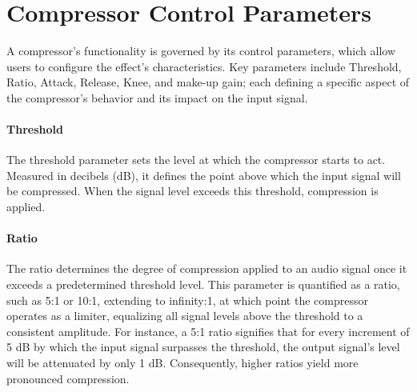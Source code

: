 \documentclass[10pt]{article}
\begin{document}
\begin{multicols*}{2}
\begin{minipage}{\linewidth}
            \label{fig:comp-ratio}
        \end{minipage}

        \section{Compressor Control Parameters}
            A compressor's functionality is governed by its control parameters, which allow users to configure the effect's characteristics. Key parameters include Threshold, Ratio, Attack, Release, Knee, and make-up gain; each defining a specific aspect of the compressor's behavior and its impact on the input signal.

            \paragraph{Threshold}
                The threshold parameter sets the level at which the compressor starts to act. Measured in decibels (dB), it defines the point above which the input signal will be compressed. When the signal level exceeds this threshold, compression is applied.

            \paragraph{Ratio}
                The ratio determines the degree of compression applied to an audio signal once it exceeds a predetermined threshold level. This parameter is quantified as a ratio, such as 5:1 or 10:1, extending to infinity:1, at which point the compressor operates as a limiter, equalizing all signal levels above the threshold to a consistent amplitude. For instance, a 5:1 ratio signifies that for every increment of 5 dB by which the input signal surpasses the threshold, the output signal's level will be attenuated by only 1 dB. Consequently, higher ratios yield more pronounced compression.


\end{multicols*}
\end{document}
